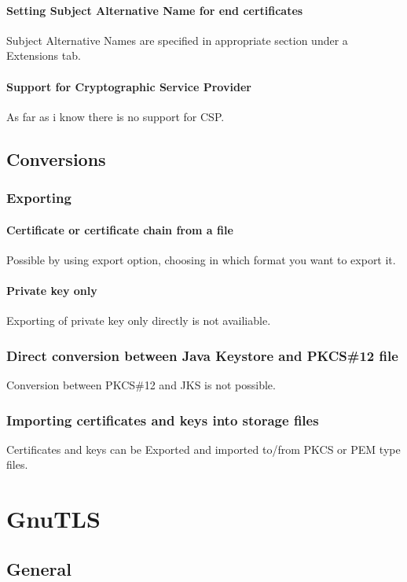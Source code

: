 \documentclass[10pt, a4paper]{report}
\begin{document}
    \subsubsection{Setting Subject Alternative Name for end certificates}
Subject Alternative Names are specified in appropriate section under a Extensions tab.
    \subsubsection{Support for Cryptographic Service Provider}
As far as i know there is no support for CSP.
\section{Conversions}

  \subsection{Exporting}
  
    \subsubsection{Certificate or certificate chain from a file}
Possible by using export option, choosing in which format you want to export it.
    \subsubsection{Private key only}
Exporting of private key only directly is not availiable.
  \subsection{Direct conversion between Java Keystore and PKCS\#12 file}
Conversion between PKCS\#12 and JKS is not possible.
  \subsection{Importing certificates and keys into storage files}
Certificates and keys can be Exported and imported to/from PKCS or PEM type files.

\chapter{GnuTLS}

\section{General}
\end{document}
